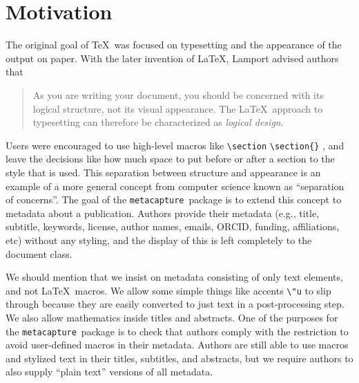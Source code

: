 \documentclass{article}
\newcommand{\pkgname}{\texttt{metacapture}}
\newcommand{\cmd}[2][]{%
  \def\FirstArg{#1}%
  \ifx\FirstArg\empty%
    \texttt{\textbackslash{}#2}%
  \else%
    \texttt{\textbackslash{}#2\{#1\}}%
  \fi
}
\begin{document}
\section{Motivation}
The original goal of \TeX\ was focused on typesetting and
the appearance of the output on paper. With the later invention of
\LaTeX, Lamport advised authors that
\begin{quote}As you are writing your document, you should be concerned with its logical
structure, not its visual appearance. The \LaTeX\ approach to typesetting
can therefore be characterized as \emph{logical design}.~\cite[\S 1.4]{latex}
\end{quote}
Users were encouraged to use high-level macros like \cmd{section}, and
leave the decisions like how much space to put before or after a
section to the style that is used.  This separation between structure
and appearance is an example of a more general concept from computer
science known as ``separation of concerns''. The goal of the \pkgname\
package is to extend this concept to metadata about a publication.
Authors provide their metadata (e.g., title, subtitle, keywords,
license, author names, emails, ORCID, funding, affiliations, etc)
without any styling, and the display of this is left completely to the
document class.

We should mention that we insist on metadata consisting of only text
elements, and not \LaTeX\ macros. We allow some simple things like
accents \verb+\"u+ to slip through because they are easily converted
to just text in a post-processing step. We also allow mathematics
inside titles and abstracts. One of the purposes for the \pkgname\
package is to check that authors comply with the restriction to avoid
user-defined macros in their metadata. Authors are still able to use macros and
stylized text in their titles, subtitles, and abstracts, but we
require authors to also supply ``plain text'' versions of all
metadata.
\end{document}
